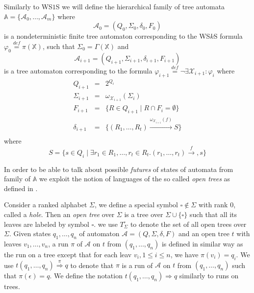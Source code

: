 Similarly to WS$1$S we will define the hierarchical family of tree automata
$\mathbb{A} = \{\mathcal{A}_0,\ldots,\mathcal{A}_m\}$ where
\begin{equation}
 \mathcal{A}_0 = (Q_0, \Sigma_0, \delta_0, F_0)
\end{equation} is a nondeterministic finite tree automaton corresponding to the
WS$k$S formula $\varphi_0 \overset{\mathit{def}}{=} \pi(\mathbb{X})$, such that
$\Sigma_0 = \Gamma(\mathbb{X})$ and
\begin{equation}
 \mathcal{A}_{i+1} = (Q_{i+1}, \Sigma_{i+1}, \delta_{i+1}, F_{i+1})
\end{equation}
is a tree automaton corresponding to the formula $\varphi_{i+1}
\overset{\mathit{def}}{=} \neg\exists\mathcal{X}_{i+1}: \varphi_i$ where
\begin{eqnarray}
 Q_{i+1} & = & 2^{Q_i}\\
 \Sigma_{i+1} & = & \omega_{\mathcal{X}_{i+1}}(\Sigma_i)\\
 F_{i+1} & = & \{R \in Q_{i+1} \mid R \cap F_i = \emptyset\}\\
 \delta_{i+1} & = & \{(R_1,\ldots,R_t)
 \overset{\omega_{\mathcal{X}_{i+1}}(f)}{\longrightarrow} S\}\\
\end{eqnarray}
where
\begin{equation}
S = \{s \in Q_i \mid \exists r_1 \in R_1,\ldots,r_t \in R_t.
 (r_1,\ldots,r_t) \overset{f}{\longrightarrow}, s\}
\end{equation}

In order to be able to talk about possible \emph{futures} of states of automata
from family of $\mathbb{A}$ we exploit the notion of languages of the so called
\emph{open trees} as defined in \cite{tacas}.

Consider a ranked alphabet $\Sigma$, we define a special symbol $\square \notin
\Sigma$ with rank 0, called a \emph{hole}. Then an \emph{open tree} over
$\Sigma$ is a tree over $\Sigma \cup \{\square\}$ such that all its leaves are
labeled by symbol $\square$. we use $T_\Sigma^\square$ to denote the set of all
open trees over $\Sigma$. Given states $q_1,\ldots,q_n$ of automaton
$\mathcal{A} = (Q, \Sigma, \delta, F)$ and an open tree $t$ with leaves
$v_1,\ldots,v_n$, a run $\pi$ of $\mathcal{A}$ on $t$ from $(q_1,\ldots,q_n)$ is
defined in similar way as the run on a tree except that for each leav $v_i, 1
\leq i \leq n$, we have $\pi(v_i) = q_i$. We use $t(q_1,\ldots,q_n)
\overset{\pi}{\Longrightarrow} q$ to denote that $\pi$ is a run of $\mathcal{A}$
on $t$ from $(q_1,\ldots,q_n)$ such that $\pi(\epsilon) = q$. We define the
notation $t(q_1,\ldots,q_n) \Longrightarrow q$ similarly to runs on trees.

